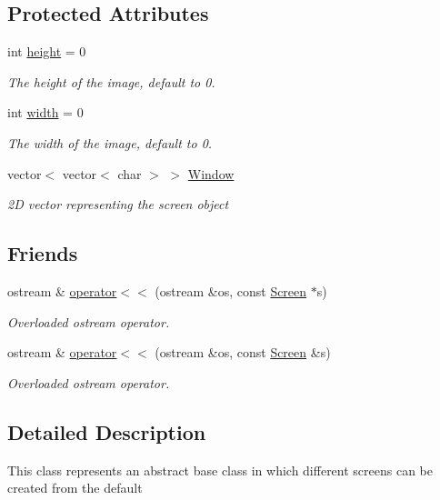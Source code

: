 \subsection*{Protected Attributes}
\begin{DoxyCompactItemize}
\item 
int \hyperlink{classScreen_a55405920693276db8fbdbf3a903b8d2f}{height} = 0
\begin{DoxyCompactList}\small\item\em The height of the image, default to 0. \end{DoxyCompactList}\item 
int \hyperlink{classScreen_a49be8f8ccf7ed7a3151a761495c0ce21}{width} = 0
\begin{DoxyCompactList}\small\item\em The width of the image, default to 0. \end{DoxyCompactList}\item 
vector$<$ vector$<$ char $>$ $>$ \hyperlink{classScreen_a7349f56b4976f03dc9977dc613a8bbab}{Window}
\begin{DoxyCompactList}\small\item\em 2\-D vector representing the screen object \end{DoxyCompactList}\end{DoxyCompactItemize}
\subsection*{Friends}
\begin{DoxyCompactItemize}
\item 
ostream \& \hyperlink{classScreen_a9d1583ec176b804e06d7c6d2a8bf3bcd}{operator$<$$<$} (ostream \&os, const \hyperlink{classScreen}{Screen} $\ast$s)
\begin{DoxyCompactList}\small\item\em Overloaded ostream operator. \end{DoxyCompactList}\item 
ostream \& \hyperlink{classScreen_adb701ccee14124fb66506086b5a34199}{operator$<$$<$} (ostream \&os, const \hyperlink{classScreen}{Screen} \&s)
\begin{DoxyCompactList}\small\item\em Overloaded ostream operator. \end{DoxyCompactList}\end{DoxyCompactItemize}


\subsection{Detailed Description}
This class represents an abstract base class in which different screens can be created from the default 

